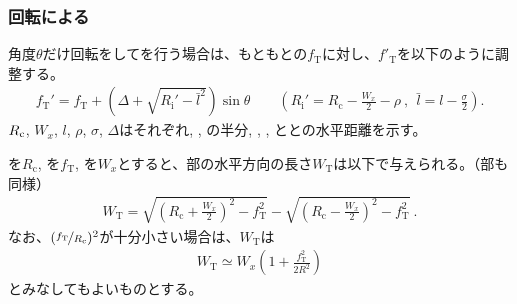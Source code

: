 \subsubsection{\indexTableAlocationAdjustment\nameTable 回転による\nameAlocationAdjustment}
角度$\theta$だけ\indexTableAlocationAdjustment\nameTable 回転をして\nameAlocationAdjustment を行う場合は、もともとの\TopAlocationLength$f_\mathrm T$に対し、\TopReAlocationLength$f'_\mathrm T$を以下のように調整する。
\begin{align*}
  f_\mathrm T'
  = f_\mathrm T+\left(\Delta+\sqrt{R_\mathrm i'-\bar l^2}\right)\sin\theta\qquad
    \left(R_\mathrm i' = R_\mathrm c-\frac{W_x}2-\rho~,~~\bar l = l-\frac\sigma2\right).
\end{align*}
$R_\textrm c$, $W_x$, $l$, $\rho$, $\sigma$, $\Delta$はそれぞれ\CenterCurvatureRadius, \ACOD, \JigWidth の半分, \ReceiverPlateRadius, \ReceiverPlateWidth, \ReceiverPlateCenter と\TableCenter との水平距離を示す。



\clearpage
\nameCenterCurvatureRadius を$R_\mathrm c$, \TopAlocationLength を$f_\mathrm T$, \ACOD を$W_x$とすると、\TopEndFace 部の水平方向の長さ$W_\mathrm T$は以下で与えられる。（\BottomEndFace 部も同様）
\begin{align*}
  W_\mathrm T
  = \sqrt{\left(R_\mathrm c+\frac{W_x}2\right)^2-f_\mathrm T^2}
    -\sqrt{\left(R_\mathrm c-\frac{W_x}2\right)^2-f_\mathrm T^2}\ .
\end{align*}
なお、$(\nicefrac{f_\mathrm T}{R_\mathrm c})^2$が十分小さい場合は、$W_\mathrm T$は
\begin{align*}
  W_\mathrm T \simeq W_x\left(1+\frac{f_\mathrm T^2}{2R^2}\right)
\end{align*}
とみなしてもよいものとする。




